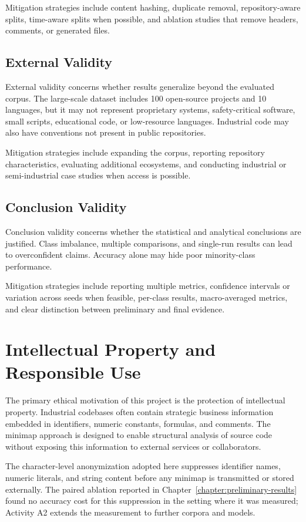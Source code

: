 Mitigation strategies include content hashing, duplicate removal, repository-aware
splits, time-aware splits when possible, and ablation studies that remove
headers, comments, or generated files.

\subsection{External Validity}

External validity concerns whether results generalize beyond the evaluated
corpus. The large-scale dataset includes 100 open-source projects and 10
languages, but it may not represent proprietary systems, safety-critical
software, small scripts, educational code, or low-resource languages. Industrial
code may also have conventions not present in public repositories.

Mitigation strategies include expanding the corpus, reporting repository
characteristics, evaluating additional ecosystems, and conducting industrial or
semi-industrial case studies when access is possible.

\subsection{Conclusion Validity}

Conclusion validity concerns whether the statistical and analytical conclusions
are justified. Class imbalance, multiple comparisons, and single-run results can
lead to overconfident claims. Accuracy alone may hide poor minority-class
performance.

Mitigation strategies include reporting multiple metrics, confidence intervals
or variation across seeds when feasible, per-class results, macro-averaged
metrics, and clear distinction between preliminary and final evidence.

\section{Intellectual Property and Responsible Use}

The primary ethical motivation of this project is the protection of intellectual
property. Industrial codebases often contain strategic business information
embedded in identifiers, numeric constants, formulas, and comments. The
minimap approach is designed to enable structural analysis of source code without
exposing this information to external services or collaborators.

The character-level anonymization adopted here suppresses identifier names,
numeric literals, and string content before any minimap is transmitted or
stored externally. The paired ablation reported in
Chapter~\ref{chapter:preliminary-results} found no accuracy cost for this
suppression in the setting where it was measured; Activity A2 extends the
measurement to further corpora and models.

